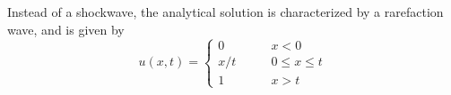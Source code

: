 \documentclass{myproject}
\begin{document}
Instead of a shockwave, the analytical solution is characterized by a rarefaction wave, and is given by
\begin{equation}
    u(x,t) = \begin{cases}
        0 \qquad & x < 0 \\
        x/t \qquad & 0 \leq x \leq t \\
        1 \qquad & x > t
    \end{cases}
\end{equation}

\end{document}
